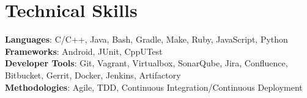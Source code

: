 \documentclass[letterpaper,11pt]{article}
\begin{document}
\section{Technical Skills}
 \begin{itemize}[leftmargin=0.15in, label={}]
    \small{\item{
     \textbf{Languages}{: C/C++, Java, Bash, Gradle, Make, Ruby, JavaScript, Python} \\
     \textbf{Frameworks}{: Android, JUnit, CppUTest} \\
     \textbf{Developer Tools}{: Git, Vagrant, Virtualbox, SonarQube, Jira, Confluence, Bitbucket, Gerrit, Docker, Jenkins, Artifactory} \\
     \textbf{Methodologies}{: Agile, TDD, Continuous Integration/Continuous Deployment} \\
    }}
 \end{itemize}


\end{document}
